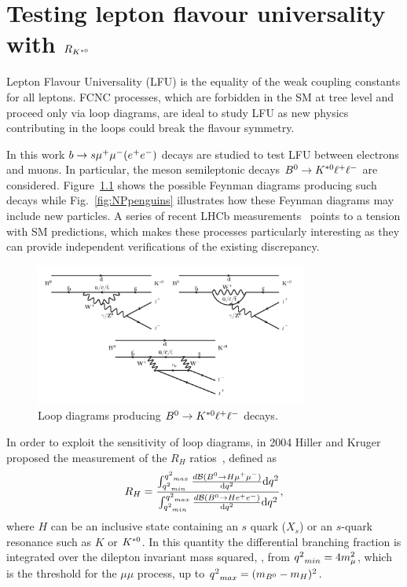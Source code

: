 \chapter{Testing lepton flavour universality with $R_{{{K}^{*0}}}$}
\label{sec:RKst_theory}

Lepton Flavour Universality (LFU) is the equality of the weak coupling constants for all leptons.
FCNC processes, which are forbidden in the SM at tree level and proceed only via loop diagrams,
are ideal to study LFU as new physics contributing in the loops could break the flavour symmetry.
 
In this work $b \rightarrow s{\mu^+\mu^-} (e^+ e^-)$ decays are studied to test LFU between electrons and muons. 
In particular, the \Bz meson semileptonic decays ${{B}^0}\rightarrow{\ensuremath{{K}^{*0}}}\ell^+ \ell^-$ are considered.
Figure~\ref{fig:RKpenguins} shows the possible Feynman diagrams  producing such decays while 
Fig.~\ref{fig:NPpenguins} illustrates how these Feynman diagrams may include new particles. 
A series of recent LHCb measurements~\cite{TomRDreview} points to a tension with SM predictions, which makes
these processes particularly interesting as they can provide independent verifications of the existing discrepancy.
%
\begin{figure}[h]
\centering \includegraphics[width=0.8\textwidth]{RKst/figs/penguins3.png}
\caption{Loop diagrams producing ${{B}^0} \rightarrow {\ensuremath{{K}^{*0}}}\ell^+ \ell^-$ decays.}
\label{fig:RKpenguins}
\end{figure}

In order to exploit the sensitivity of loop diagrams, in 2004 Hiller and Kruger proposed the measurement 
of the $R_H$ ratios~\cite{Hiller:2003js}, defined as
\begin{equation}
\label{eqRX}
R_{H} = \frac{\int_{{q^2}_{min}}^{{q^2}_{max}} \frac{ d{\cal B}({{B}^0} \rightarrow H {\mu^+\mu^-}) }{\mathrm{d}{q^2}}\mathrm{d}{q^2}}{ \int_{{q^2}_{min}}^{{q^2}_{max}}\frac{ d{\cal B}({{B}^0} \rightarrow H{e^+e^-}) }{\mathrm{d}{q^2}} \mathrm{d}{q^2}} ,
\end{equation}
where $H$ can be an inclusive state containing an $s$ quark ($X_s$) or an $s$-quark resonance such as $K$ or ${{K}^{*0}}$.
In this quantity the differential branching fraction is integrated over the dilepton invariant mass squared, \qsq, from 
${q^2}_{min} = 4m_{\mu}^2$, which is the threshold for the $\mu\mu$ process, up to \mbox{${q^2}_{max} = (m_{{{B}^0}} - m_H)^2$.} 

